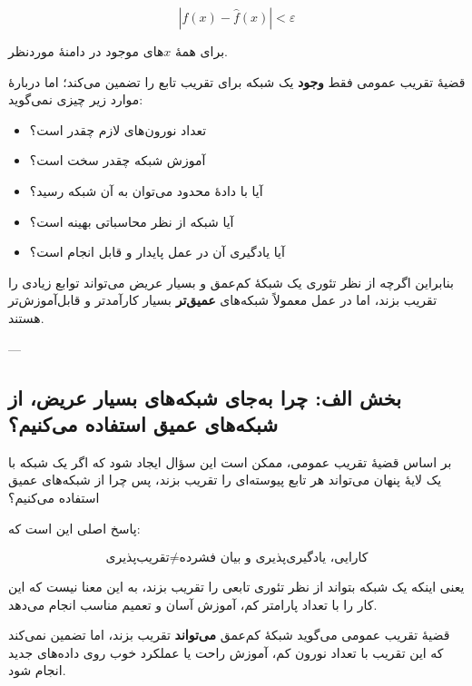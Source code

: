 \documentclass[12pt,a4paper]{article}
\begin{document}
\[
\left|f(x)-\hat{f}(x)\right|<\varepsilon
\]

برای همهٔ \(x\)های موجود در دامنهٔ موردنظر.

\begin{tcolorbox}[
	colback=lightblue,
	colframe=mainblue,
	title=نکتهٔ کلیدی دربارهٔ قضیه تقریب عمومی
	]
	قضیهٔ تقریب عمومی فقط \textbf{وجود} یک شبکه برای تقریب تابع را تضمین می‌کند؛ اما دربارهٔ موارد زیر چیزی نمی‌گوید:
	
	\begin{itemize}
		\item تعداد نورون‌های لازم چقدر است؟
		\item آموزش شبکه چقدر سخت است؟
		\item آیا با دادهٔ محدود می‌توان به آن شبکه رسید؟
		\item آیا شبکه از نظر محاسباتی بهینه است؟
		\item آیا یادگیری آن در عمل پایدار و قابل انجام است؟
	\end{itemize}
\end{tcolorbox}

بنابراین اگرچه از نظر تئوری یک شبکهٔ کم‌عمق و بسیار عریض می‌تواند توابع زیادی را تقریب بزند، اما در عمل معمولاً شبکه‌های \textbf{عمیق‌تر} بسیار کارآمدتر و قابل‌آموزش‌تر هستند.

---

\subsection{بخش الف: چرا به‌جای شبکه‌های بسیار عریض، از شبکه‌های عمیق استفاده می‌کنیم؟}

بر اساس قضیهٔ تقریب عمومی، ممکن است این سؤال ایجاد شود که اگر یک شبکه با یک لایهٔ پنهان می‌تواند هر تابع پیوسته‌ای را تقریب بزند، پس چرا از شبکه‌های عمیق استفاده می‌کنیم؟

پاسخ اصلی این است که:

\[
\text{تقریب‌پذیری} \neq \text{کارایی، یادگیری‌پذیری و بیان فشرده}
\]

یعنی اینکه یک شبکه بتواند از نظر تئوری تابعی را تقریب بزند، به این معنا نیست که این کار را با تعداد پارامتر کم، آموزش آسان و تعمیم مناسب انجام می‌دهد.

\begin{tcolorbox}[
	colback=softorange,
	colframe=golden,
	title=ایدهٔ اصلی بخش الف,
	coltitle=black
	]
	قضیهٔ تقریب عمومی می‌گوید شبکهٔ کم‌عمق \textbf{می‌تواند} تقریب بزند، اما تضمین نمی‌کند که این تقریب با تعداد نورون کم، آموزش راحت یا عملکرد خوب روی داده‌های جدید انجام شود.
\end{tcolorbox}
\end{document}
